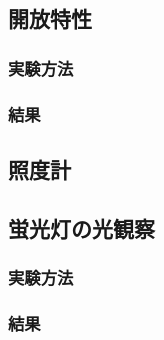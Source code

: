 \documentclass[titlepage]{jsarticle}
\begin{document}
    \subsection{開放特性}
        \subsubsection{実験方法}

        \subsubsection{結果}

    \subsection{照度計}

    \subsection{蛍光灯の光観察}
        \subsubsection{実験方法}

        \subsubsection{結果}
\end{document}

